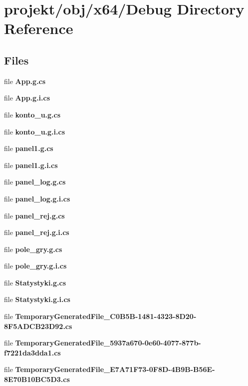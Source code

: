 \section{projekt/obj/x64/\+Debug Directory Reference}
\label{dir_13b799d299195fdeedcab84db9f5be88}
\subsection*{Files}
\begin{DoxyCompactItemize}
\item 
file \textbf{ App.\+g.\+cs}
\item 
file \textbf{ App.\+g.\+i.\+cs}
\item 
file \textbf{ konto\+\_\+u.\+g.\+cs}
\item 
file \textbf{ konto\+\_\+u.\+g.\+i.\+cs}
\item 
file \textbf{ panel1.\+g.\+cs}
\item 
file \textbf{ panel1.\+g.\+i.\+cs}
\item 
file \textbf{ panel\+\_\+log.\+g.\+cs}
\item 
file \textbf{ panel\+\_\+log.\+g.\+i.\+cs}
\item 
file \textbf{ panel\+\_\+rej.\+g.\+cs}
\item 
file \textbf{ panel\+\_\+rej.\+g.\+i.\+cs}
\item 
file \textbf{ pole\+\_\+gry.\+g.\+cs}
\item 
file \textbf{ pole\+\_\+gry.\+g.\+i.\+cs}
\item 
file \textbf{ Statystyki.\+g.\+cs}
\item 
file \textbf{ Statystyki.\+g.\+i.\+cs}
\item 
file \textbf{ Temporary\+Generated\+File\+\_\+C0\+B5\+B-\/1481-\/4323-\/8\+D20-\/8\+F5\+A\+D\+C\+B23\+D92.\+cs}
\item 
file \textbf{ Temporary\+Generated\+File\+\_\+5937a670-\/0e60-\/4077-\/877b-\/f7221da3dda1.\+cs}
\item 
file \textbf{ Temporary\+Generated\+File\+\_\+\+E7\+A71\+F73-\/0\+F8\+D-\/4\+B9\+B-\/\+B56\+E-\/8\+E70\+B10\+B\+C5\+D3.\+cs}
\end{DoxyCompactItemize}
